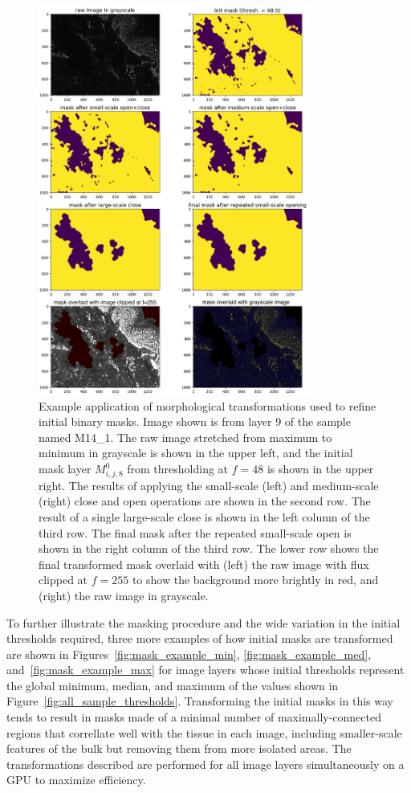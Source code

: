 \documentclass[letterpaper,11pt]{article}
\newcommand{\reffig}[1]{Figure~\ref{#1}}
\begin{document}
\begin{figure}[!ht]
\centering
\includegraphics[width=0.80\textwidth]{images/masking/image_286_layer_9_masks}
\caption{\footnotesize Example application of morphological transformations used to refine initial binary masks. Image shown is from layer 9 of the sample named M14\_1. The raw image stretched from maximum to minimum in grayscale is shown in the upper left, and the initial mask layer $M^{0}_{i,j,8}$ from thresholding at $f=48$ is shown in the upper right. The results of applying the small-scale (left) and medium-scale (right) close and open operations are shown in the second row. The result of a single large-scale close is shown in the left column of the third row. The final mask after the repeated small-scale open is shown in the right column of the third row. The lower row shows the final transformed mask overlaid with (left) the raw image with flux clipped at $f=255$ to show the background more brightly in red, and (right) the raw image in grayscale.}
\label{fig:morphological_transformations}
\end{figure}

To further illustrate the masking procedure and the wide variation in the initial thresholds required, three more examples of how initial masks are transformed are shown in Figures~\ref{fig:mask_example_min}, \ref{fig:mask_example_med}, and~\ref{fig:mask_example_max} for image layers whose initial thresholds represent the global minimum, median, and maximum of the values shown in \reffig{fig:all_sample_thresholds}. Transforming the initial masks in this way tends to result in masks made of a minimal number of maximally-connected regions that correllate well with the tissue in each image, including smaller-scale features of the bulk but removing them from more isolated areas. The transformations described are performed for all image layers simultaneously on a GPU to maximize efficiency. 
\end{document}
